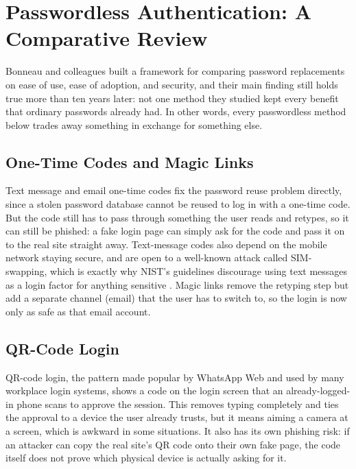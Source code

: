 \section{Passwordless Authentication: A Comparative Review}
\label{sec:lit-passwordless}

Bonneau and colleagues \cite{bonneau2012quest} built a framework for
comparing password replacements on ease of use, ease of adoption, and
security, and their main finding still holds true more than ten years
later: not one method they studied kept every benefit that ordinary
passwords already had. In other words, every passwordless method below
trades away something in exchange for something else.

\subsection{One-Time Codes and Magic Links}

Text message and email one-time codes fix the password reuse problem
directly, since a stolen password database cannot be reused to log in with
a one-time code. But the code still has to pass through something the
user reads and retypes, so it can still be phished: a fake login page can
simply ask for the code and pass it on to the real site straight away.
Text-message codes also depend on the mobile network staying secure, and
are open to a well-known attack called SIM-swapping, which is exactly why
NIST's guidelines discourage using text messages as a login factor for
anything sensitive \cite{nist80063b}. Magic links remove the retyping step
but add a separate channel (email) that the user has to switch to, so the
login is now only as safe as that email account.

\subsection{QR-Code Login}

QR-code login, the pattern made popular by WhatsApp Web and used by many
workplace login systems, shows a code on the login screen that an
already-logged-in phone scans to approve the session. This removes typing
completely and ties the approval to a device the user already trusts, but
it means aiming a camera at a screen, which is awkward in some situations.
It also has its own phishing risk: if an attacker can copy the real site's
QR code onto their own fake page, the code itself does not prove which
physical device is actually asking for it.

